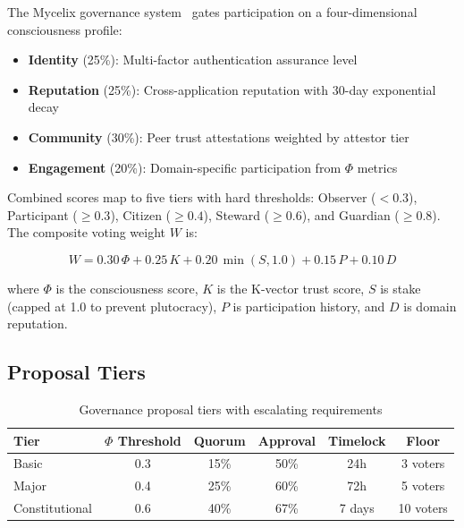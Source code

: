 \documentclass[11pt,a4paper]{article}
\begin{document}
The Mycelix governance system~\cite{holochain} gates participation on a four-dimensional consciousness profile:

\begin{itemize}
    \item \textbf{Identity} (25\%): Multi-factor authentication assurance level
    \item \textbf{Reputation} (25\%): Cross-application reputation with 30-day exponential decay
    \item \textbf{Community} (30\%): Peer trust attestations weighted by attestor tier
    \item \textbf{Engagement} (20\%): Domain-specific participation from $\Phi$ metrics~\cite{tononi}
\end{itemize}

Combined scores map to five tiers with hard thresholds: Observer ($< 0.3$), Participant ($\geq 0.3$), Citizen ($\geq 0.4$), Steward ($\geq 0.6$), and Guardian ($\geq 0.8$). The composite voting weight $W$ is:

\begin{equation}
    W = 0.30\,\Phi + 0.25\,K + 0.20\,\min(S, 1.0) + 0.15\,P + 0.10\,D
    \label{eq:weight}
\end{equation}

\noindent where $\Phi$ is the consciousness score, $K$ is the K-vector trust score, $S$ is stake (capped at 1.0 to prevent plutocracy), $P$ is participation history, and $D$ is domain reputation.

\subsection{Proposal Tiers}

\begin{table}[h]
\centering
\caption{Governance proposal tiers with escalating requirements}
\label{tab:tiers}
\begin{tabular}{lccccc}
\toprule
\textbf{Tier} & \textbf{$\Phi$ Threshold} & \textbf{Quorum} & \textbf{Approval} & \textbf{Timelock} & \textbf{Floor} \\
\midrule
Basic & 0.3 & 15\% & 50\% & 24h & 3 voters \\
Major & 0.4 & 25\% & 60\% & 72h & 5 voters \\
Constitutional & 0.6 & 40\% & 67\% & 7 days & 10 voters \\
\bottomrule
\end{tabular}
\end{table}
\end{document}
